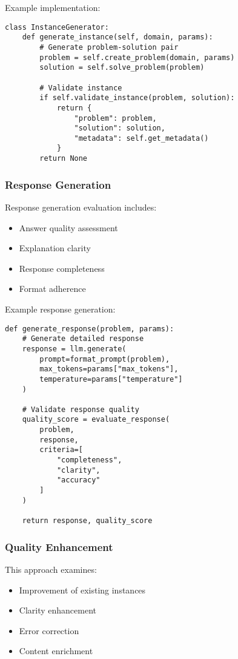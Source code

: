 \documentclass[10pt,conference]{IEEEtran}
\begin{document}
Example implementation:
\begin{lstlisting}
class InstanceGenerator:
    def generate_instance(self, domain, params):
        # Generate problem-solution pair
        problem = self.create_problem(domain, params)
        solution = self.solve_problem(problem)
        
        # Validate instance
        if self.validate_instance(problem, solution):
            return {
                "problem": problem,
                "solution": solution,
                "metadata": self.get_metadata()
            }
        return None
\end{lstlisting}

\subsubsection{Response Generation}
Response generation evaluation includes:
\begin{itemize}
    \item Answer quality assessment
    \item Explanation clarity
    \item Response completeness
    \item Format adherence
\end{itemize}

Example response generation:
\begin{lstlisting}
def generate_response(problem, params):
    # Generate detailed response
    response = llm.generate(
        prompt=format_prompt(problem),
        max_tokens=params["max_tokens"],
        temperature=params["temperature"]
    )
    
    # Validate response quality
    quality_score = evaluate_response(
        problem,
        response,
        criteria=[
            "completeness",
            "clarity",
            "accuracy"
        ]
    )
    
    return response, quality_score
\end{lstlisting}

\subsubsection{Quality Enhancement}
This approach examines:
\begin{itemize}
    \item Improvement of existing instances
    \item Clarity enhancement
    \item Error correction
    \item Content enrichment
\end{itemize}
\end{document}

